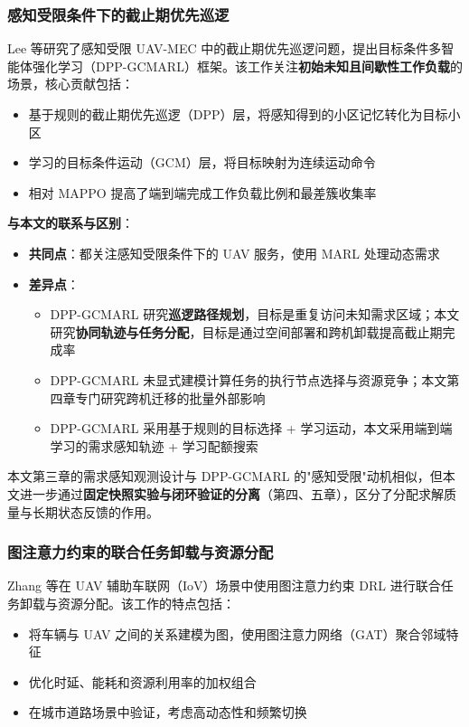 \subsubsection{感知受限条件下的截止期优先巡逻}

Lee 等研究了感知受限 UAV-MEC 中的截止期优先巡逻问题\cite{lee2024deadline}，提出目标条件多智能体强化学习（DPP-GCMARL）框架。该工作关注\textbf{初始未知且间歇性工作负载}的场景，核心贡献包括：
\begin{itemize}
    \item 基于规则的截止期优先巡逻（DPP）层，将感知得到的小区记忆转化为目标小区
    \item 学习的目标条件运动（GCM）层，将目标映射为连续运动命令
    \item 相对 MAPPO 提高了端到端完成工作负载比例和最差簇收集率
\end{itemize}

\textbf{与本文的联系与区别}：
\begin{itemize}
    \item \textbf{共同点}：都关注感知受限条件下的 UAV 服务，使用 MARL 处理动态需求
    \item \textbf{差异点}：
    \begin{itemize}
        \item DPP-GCMARL 研究\textbf{巡逻路径规划}，目标是重复访问未知需求区域；本文研究\textbf{协同轨迹与任务分配}，目标是通过空间部署和跨机卸载提高截止期完成率
        \item DPP-GCMARL 未显式建模计算任务的执行节点选择与资源竞争；本文第四章专门研究跨机迁移的批量外部影响
        \item DPP-GCMARL 采用基于规则的目标选择 + 学习运动，本文采用端到端学习的需求感知轨迹 + 学习配额搜索
    \end{itemize}
\end{itemize}

本文第三章的需求感知观测设计与 DPP-GCMARL 的"感知受限"动机相似，但本文进一步通过\textbf{固定快照实验与闭环验证的分离}（第四、五章），区分了分配求解质量与长期状态反馈的作用。

\subsubsection{图注意力约束的联合任务卸载与资源分配}

Zhang 等在 UAV 辅助车联网（IoV）场景中使用图注意力约束 DRL 进行联合任务卸载与资源分配\cite{zhang2024graph}。该工作的特点包括：
\begin{itemize}
    \item 将车辆与 UAV 之间的关系建模为图，使用图注意力网络（GAT）聚合邻域特征
    \item 优化时延、能耗和资源利用率的加权组合
    \item 在城市道路场景中验证，考虑高动态性和频繁切换
\end{itemize}

